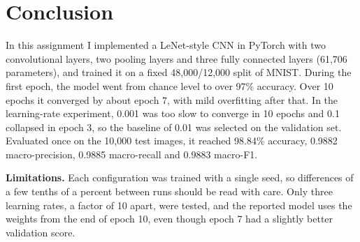 \chapter{Conclusion}
\label{ch:conclusion}


In this assignment I implemented a LeNet-style CNN in PyTorch with two
convolutional layers, two pooling layers and three fully connected layers
(61,706 parameters), and trained it on a fixed 48,000/12,000 split of
MNIST. During the first epoch, the model went from chance level to over
97\% accuracy. Over 10 epochs it converged by about epoch 7, with mild
overfitting after that. In the learning-rate experiment, 0.001 was too
slow to converge in 10 epochs and 0.1 collapsed in epoch 3, so the
baseline of 0.01 was selected on the validation set. Evaluated once on
the 10,000 test images, it reached 98.84\% accuracy, 0.9882
macro-precision, 0.9885 macro-recall and 0.9883 macro-F1.

\textbf{Limitations.} Each configuration was trained with a single seed,
so differences of a few tenths of a percent between runs should be read
with care. Only three learning rates, a factor of 10 apart, were tested,
and the reported model uses the weights from the end of epoch 10, even
though epoch 7 had a slightly better validation score.
